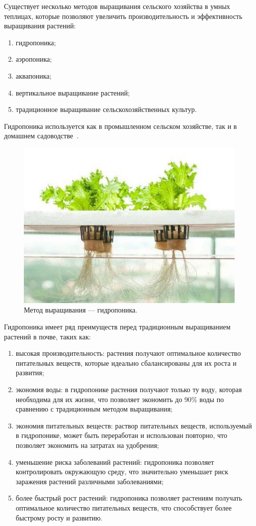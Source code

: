 Существует несколько методов выращивания сельского хозяйства в умных теплицах, которые позволяют увеличить производительность и эффективность выращивания растений:

\begin{enumerate}
    \item гидропоника;
    \item аэропоника;
    \item аквапоника;
    \item вертикальное выращивание растений;
    \item традиционное выращивание сельскохозяйственных культур.
\end{enumerate}

Гидропоника используется как в промышленном сельском хозяйстве, так и в домашнем садоводстве~\cite{Hidroponica}.

\begin{figure}[H]
    \centering
    \includegraphics{images/hidrobonica.jpg}
    \caption{Метод выращивания --- гидропоника.}
    \label{fig:hidroponica}
\end{figure}

Гидропоника имеет ряд преимуществ перед традиционным выращиванием растений в почве, таких как:

\begin{enumerate}
    \item высокая производительность: растения получают оптимальное количество питательных веществ, которые идеально сбалансированы для их роста и развития;
    \item экономия воды: в гидропонике растения получают только ту воду, которая необходима для их жизни, что позволяет экономить до 90\% воды по сравнению с традиционным методом выращивания;
    \item экономия питательных веществ: раствор питательных веществ, используемый в гидропонике, может быть переработан и использован повторно, что позволяет экономить на затратах на удобрения;
    \item уменьшение риска заболеваний растений: гидропоника позволяет контролировать окружающую среду, что значительно уменьшает риск заражения растений различными заболеваниями;
    \item более быстрый рост растений: гидропоника позволяет растениям получать оптимальное количество питательных веществ, что способствует более быстрому росту и развитию.
\end{enumerate}

